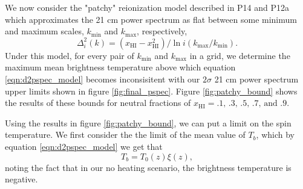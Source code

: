 \documentclass[twocolumn,numberedappendix]{emulateapj} \shorttitle{PSA64}
\begin{document}
We now consider the "patchy" reionization model described in P14 and P12a which
approximates the 21 cm power spectrum as flat between some minimum and maximum
scales, $k_{\text{min}}$ and $k_{\text{max}}$, respectively,
\begin{equation}\label{eqn:patchy_bound}
    \Delta^{2}_{i}(k) = (x_{\text{HI}} -
x_{\text{HI}}^{2})/\ln{i(k_{\text{max}}/k_{\text{min}})}.
\end{equation}
Under this model, for every pair of $k_{\text{min}}$ and $k_{\text{max}}$ in a
grid, we 
determine the maximum mean brightness temperature above which equation
\ref{eqn:d2pspec_model} becomes inconsisitent with our $2\sigma$ 21 cm power
spectrum upper limits shown in figure \ref{fig:final_pspec}.
Figure \ref{fig:patchy_bound} shows the results of these bounds
for neutral fractions of $x_{\text{HI}}=\text{.1, .3, .5, .7, and .9}$. 

Using the results in figure \ref{fig:patchy_bound}, we can put a limit on the
spin temperature. We first consider the the limit of the mean value of $T_{b}$,
which by equation \ref{eqn:d2pspec_model} we get that 
\begin{equation}
    T_{b} = T_{0}(z)\xi(z), 
\end{equation}
noting the fact that in our no heating scenario, the brightness temperature is
negative. 






%

%
%
%
%
%
%
%
%
%
%
\end{document}
